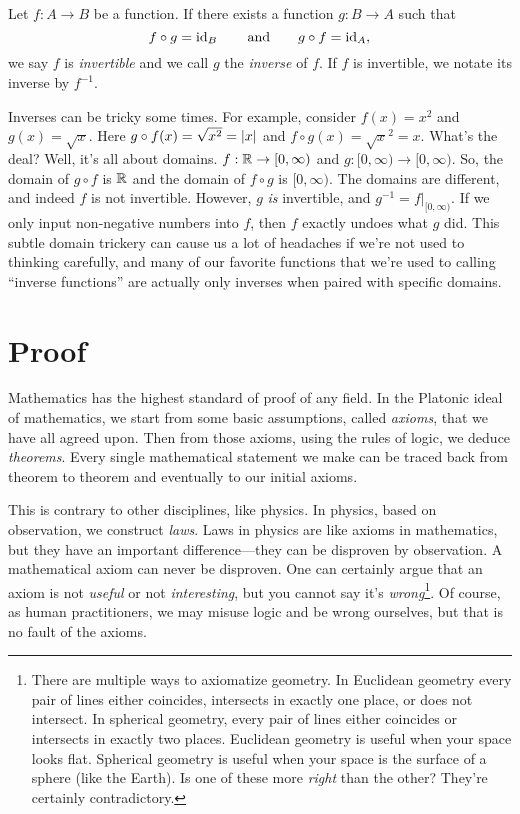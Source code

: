 	\begin{definition}
		Let $f:A\to B$ be a function.  If there exists a function $g:B\to A$ such that
		\[
			f\circ g=\operatorname{id}_B\qquad\text{and}\qquad g\circ f=\operatorname{id}_A,
		\]
		we say $f$ is \emph{invertible} and we call $g$ the \emph{inverse} of $f$.
		If $f$ is invertible, we notate its inverse by $f^{-1}$.
	\end{definition}

	Inverses can be tricky some times.  For example, consider $f(x)=x^2$ and $g(x)=\sqrt{x}$.
	Here $g\circ f(x)=\sqrt{x^2}=\lvert x\rvert$ and $f\circ g(x) = \sqrt{x}^2=x$.  What's the deal?
	Well, it's all about domains.  $f:\mathbb{R}\to[0,\infty)$ and $g:[0,\infty)\to[0,\infty)$.
	So, the domain of $g\circ f$ is $\mathbb{R}$ and the domain of $f\circ g$ is $[0,\infty)$.  The
	domains are different, and indeed $f$ is not invertible.  However, $g$ \emph{is} invertible,
	and $g^{-1}=f\big|_{[0,\infty)}$.  If we only input non-negative numbers into $f$, then
	$f$ exactly undoes what $g$ did.  This subtle domain trickery can cause us a lot
	of headaches if we're not used to thinking carefully, and many of our favorite functions
	that we're used to calling ``inverse functions'' are actually only inverses when paired with
	specific domains.

\section{Proof}
	Mathematics has the highest standard of proof of any field.  In the Platonic ideal
	of mathematics, we start from some basic assumptions, called \emph{axioms}, that we have
	all agreed upon.  Then from those axioms, using the rules of logic, we deduce \emph{theorems}.
	Every single mathematical statement we make can be traced back from theorem to theorem
	and eventually to our initial axioms.

	This is contrary to other disciplines, like physics.
	In physics, based on observation, we construct
	\emph{laws}.  Laws in physics are like
	axioms in mathematics, but they have an important difference---they
	can be disproven by observation.  A mathematical axiom can never be disproven.  One can
	certainly argue that an axiom is not \emph{useful} or not \emph{interesting}, but you
	cannot say it's \emph{wrong}\footnote{
		There are multiple ways to axiomatize geometry.  In
		Euclidean geometry every pair of lines either coincides, intersects in
		exactly one place, or does not intersect.  In spherical
		geometry, every pair of lines either coincides or intersects in exactly two places.  
		Euclidean geometry is useful when your space looks flat.  Spherical
		geometry is useful when your space is the surface of a sphere (like 
		the Earth).
		Is one of these more \emph{right} than the other?  They're certainly
		contradictory.
	}.
	Of course, as human practitioners, we may misuse logic and be wrong ourselves, but that
	is no fault of the axioms.

